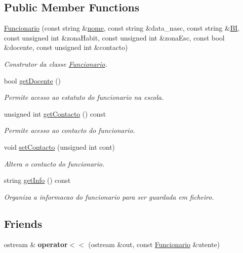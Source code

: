 \subsection*{Public Member Functions}
\begin{DoxyCompactItemize}
\item 
\mbox{\hyperlink{class_funcionario_ac6e6169c18146e5fd2c67e6ccd0ebe75}{Funcionario}} (const string \&\mbox{\hyperlink{class_utente_a328c722d27759eaa88596ccb4cf2549f}{nome}}, const string \&data\+\_\+nasc, const string \&\mbox{\hyperlink{class_utente_ac5acf8e42ccd10808d077fc0db2e05f9}{BI}}, const unsigned int \&zona\+Habit, const unsigned int \&zona\+Esc, const bool \&docente, const unsigned int \&contacto)
\begin{DoxyCompactList}\small\item\em Construtor da classe \mbox{\hyperlink{class_funcionario}{Funcionario}}. \end{DoxyCompactList}\item 
bool \mbox{\hyperlink{class_funcionario_a298a2b333cae15e6f426890c2a352dc2}{get\+Docente}} ()
\begin{DoxyCompactList}\small\item\em Permite acesso ao estatuto do funcionario na escola. \end{DoxyCompactList}\item 
unsigned int \mbox{\hyperlink{class_funcionario_a408d2f4ac6ebdebbc18072832fce9ef7}{get\+Contacto}} () const
\begin{DoxyCompactList}\small\item\em Permite acesso ao contacto do funcionario. \end{DoxyCompactList}\item 
void \mbox{\hyperlink{class_funcionario_a2288d370e92da8b533c09db5b90d888c}{set\+Contacto}} (unsigned int cont)
\begin{DoxyCompactList}\small\item\em Altera o contacto do funcionario. \end{DoxyCompactList}\item 
string \mbox{\hyperlink{class_funcionario_a3cafb55c689dcb260975d3083cef1a98}{get\+Info}} () const
\begin{DoxyCompactList}\small\item\em Organiza a informacao do funcionario para ser guardada em ficheiro. \end{DoxyCompactList}\end{DoxyCompactItemize}
\subsection*{Friends}
\begin{DoxyCompactItemize}
\item 
\mbox{\label{class_funcionario_adea2bb01573fbd53fea2ebaa08f82e92}} 
ostream \& {\bfseries operator$<$$<$} (ostream \&out, const \mbox{\hyperlink{class_funcionario}{Funcionario}} \&utente)
\end{DoxyCompactItemize}
